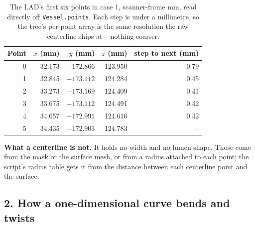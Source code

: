 \begin{table}[htbp]
  \centering
  \small
  \begin{tabular}{@{}rrrrr@{}}
    \toprule
    Point & $x$ (mm) & $y$ (mm) & $z$ (mm) & step to next (mm) \\
    \midrule
    0 & 32.173 & $-172.866$ & 123.950 & 0.79 \\
    1 & 32.845 & $-173.112$ & 124.284 & 0.45 \\
    2 & 33.273 & $-173.169$ & 124.409 & 0.41 \\
    3 & 33.675 & $-173.112$ & 124.491 & 0.42 \\
    4 & 34.057 & $-172.991$ & 124.616 & 0.42 \\
    5 & 34.435 & $-172.903$ & 124.783 & -- \\
    \bottomrule
  \end{tabular}
  \caption{The LAD's first six points in case 1, scanner-frame mm, read directly off
    \texttt{Vessel.points}. Each step is under a millimetre, so the tree's per-point array is the
    same resolution the raw centerline ships at -- nothing coarser.}
  \label{tab:week3-close-points}
\end{table}

\textbf{What a centerline is not.} It holds no width and no lumen shape. Those come from the mask
or the surface mesh, or from a radius attached to each point; the script's radius table gets it
from the distance between each centerline point and the surface.

\subsection*{2. How a one-dimensional curve bends and twists}

